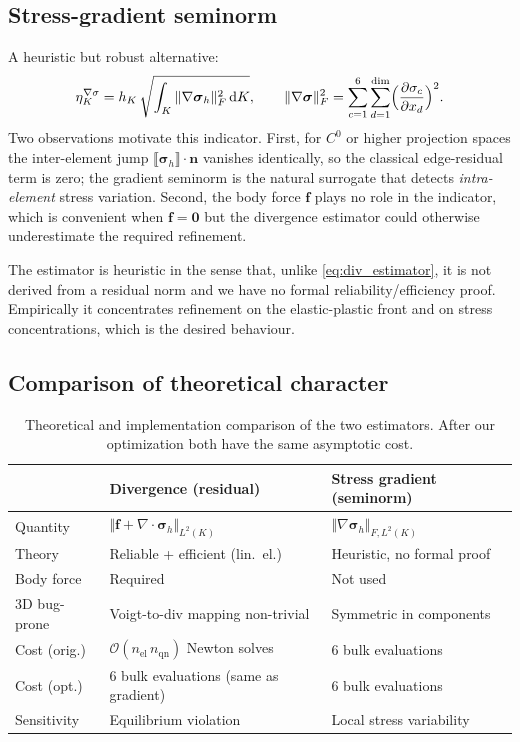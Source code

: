 \documentclass[11pt,a4paper]{article}
\newcommand{\bsigma}{\boldsymbol{\sigma}}
\newcommand{\bff}{\mathbf{f}}
\newcommand{\bn}{\mathbf{n}}
\newcommand{\divg}{\nabla \cdot}
\begin{document}
\subsection{Stress-gradient seminorm}\label{sec:est:gradsig}

A heuristic but robust alternative:
\begin{equation}
    \eta_K^{\nabla\sigma}
    = h_K\,\sqrt{\int_K \Vert \nabla \bsigma_h \Vert_F^2\,\mathrm{d}K},
\qquad
\Vert\nabla\bsigma\Vert_F^2 =
    \sum_{c=1}^6 \sum_{d=1}^{\dim} \Bigl(\frac{\partial \sigma_c}{\partial x_d}\Bigr)^2.
\label{eq:gradient_estimator}
\end{equation}
Two observations motivate this indicator.  First, for $C^0$ or higher
projection spaces the inter-element jump $\llbracket\bsigma_h\rrbracket
\cdot \bn$ vanishes identically, so the classical edge-residual term is
zero; the gradient seminorm is the natural surrogate that detects
\emph{intra-element} stress variation.  Second, the body force $\bff$
plays no role in the indicator, which is convenient when $\bff = \mathbf{0}$
but the divergence estimator could otherwise underestimate the required
refinement.

The estimator is heuristic in the sense that, unlike
\eqref{eq:div_estimator}, it is not derived from a residual norm and we
have no formal reliability/efficiency proof.  Empirically it
concentrates refinement on the elastic-plastic front and on stress
concentrations, which is the desired behaviour.

\subsection{Comparison of theoretical character}

\begin{table}[h]
\centering
\small
\begin{tabular}{lp{5.5cm}p{5.5cm}}
\toprule
& \textbf{Divergence (residual)} & \textbf{Stress gradient (seminorm)}\\
\midrule
Quantity      & $\Vert\bff + \divg\bsigma_h\Vert_{L^2(K)}$ & $\Vert\nabla\bsigma_h\Vert_{F,L^2(K)}$\\
Theory        & Reliable + efficient (lin.~el.)            & Heuristic, no formal proof\\
Body force    & Required                                    & Not used\\
3D bug-prone  & Voigt-to-div mapping non-trivial           & Symmetric in components\\
Cost (orig.)  & $\mathcal{O}(n_{\mathrm{el}}\,n_{\mathrm{qn}})$ Newton solves & 6 bulk evaluations\\
Cost (opt.)   & 6 bulk evaluations (same as gradient)       & 6 bulk evaluations\\
Sensitivity   & Equilibrium violation                       & Local stress variability\\
\bottomrule
\end{tabular}
\caption{Theoretical and implementation comparison of the two
estimators.  After our optimization both have the same asymptotic
cost.}
\end{table}
\end{document}
